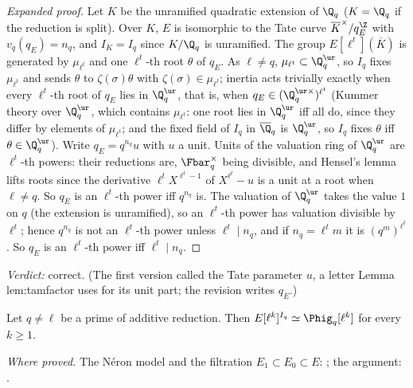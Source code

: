 \begin{sloppypar}
\begin{proof}[Expanded proof]
Let $K$ be the unramified quadratic extension of $\Q_q$ ($K=\Q_q$ if the reduction is split). Over $K$, $E$ is isomorphic to the Tate curve $\overline K^\times/q_E^{\Z}$ with
$v_q(q_E)=n_q$, and $I_K=I_q$ since $K/\Q_q$ is unramified. The group $E[\ell^t](\overline K)$ is generated by $\mu_{\ell^t}$ and one $\ell^t$-th root $\theta$ of $q_E$. As $\ell\ne q$,
$\mu_{\ell^t}\subset\Q_q^{\ur}$, so $I_q$ fixes $\mu_{\ell^t}$ and sends $\theta$ to $\zeta(\sigma)\theta$ with $\zeta(\sigma)\in\mu_{\ell^t}$; inertia acts trivially exactly when every $\ell^t$-th root of
$q_E$ lies in $\Q_q^{\ur}$, that is, when $q_E\in(\Q_q^{\ur\times})^{\ell^t}$ (Kummer theory over $\Q_q^{\ur}$, which contains $\mu_{\ell^t}$: one root lies in $\Q_q^{\ur}$ iff all do, since
they differ by elements of $\mu_{\ell^t}$; and the fixed field of $I_q$ in $\overline\Q_q$ is $\Q_q^{\ur}$, so $I_q$ fixes $\theta$ iff $\theta\in\Q_q^{\ur}$). Write $q_E=q^{n_q}u$ with $u$ a unit. Units of the
valuation ring of $\Q_q^{\ur}$ are $\ell^t$-th powers: their reductions are, $\Fbar_q^\times$ being divisible, and Hensel's lemma lifts roots since the derivative $\ell^tX^{\ell^t-1}$ of $X^{\ell^t}-u$ is a
unit at a root when $\ell\ne q$. So $q_E$ is an $\ell^t$-th power iff $q^{n_q}$ is. The valuation of $\Q_q^{\ur}$ takes the value $1$ on $q$ (the extension is unramified), so an $\ell^t$-th power
has valuation divisible by $\ell^t$; hence $q^{n_q}$ is not an $\ell^t$-th power unless $\ell^t\mid n_q$, and if $n_q=\ell^tm$ it is $(q^m)^{\ell^t}$. So $q_E$ is an $\ell^t$-th power iff $\ell^t\mid n_q$.
\end{proof}

\noindent\emph{Verdict:} correct. (The first version called the Tate parameter $u$, a letter Lemma lem:tamfactor uses for its unit part; the revision writes $q_E$.)

\begin{lemma}\label{lem:paper:inertia-invariants}
Let $q\ne\ell$ be a prime of additive reduction. Then $E[\ell^k]^{I_q}\simeq\Phig_q[\ell^k]$ for every $k\ge1$.
\end{lemma}

\noindent\emph{Where proved.} The N\'eron model and the filtration $E_1\subset E_0\subset E$: ; the argument: .


\end{sloppypar}
